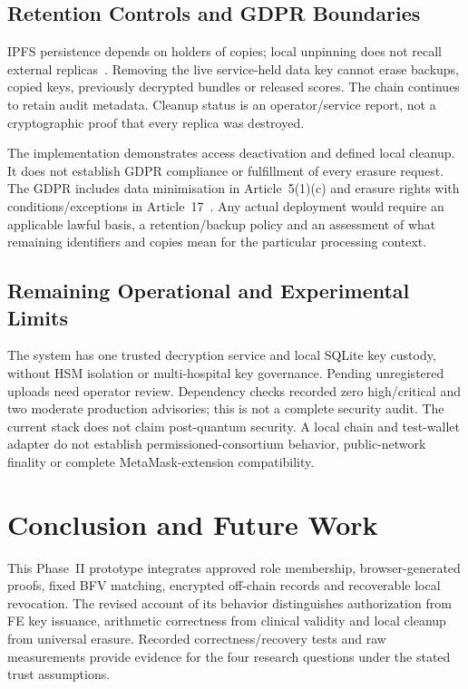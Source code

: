 \documentclass[10pt,twocolumn,a4paper]{article}
\begin{document}
\subsection{Retention Controls and GDPR Boundaries}
IPFS persistence depends on holders of copies; local unpinning does not recall
external replicas~\cite{ipfs}. Removing the live service-held data key cannot erase
backups, copied keys, previously decrypted bundles or released scores. The chain
continues to retain audit metadata. Cleanup status is an operator/service report,
not a cryptographic proof that every replica was destroyed.

The implementation demonstrates access deactivation and defined local cleanup.
It does not establish GDPR compliance or fulfillment of every erasure request.
The GDPR includes data minimisation in Article~5(1)(c) and erasure rights with
conditions/exceptions in Article~17~\cite{gdpr}. Any actual deployment would require
an applicable lawful basis, a retention/backup policy and an assessment of what
remaining identifiers and copies mean for the particular processing context.

\subsection{Remaining Operational and Experimental Limits}
The system has one trusted decryption service and local SQLite key custody,
without HSM isolation or multi-hospital key governance. Pending unregistered uploads
need operator review. Dependency checks recorded zero high/critical and two moderate
production advisories; this is not a complete security audit. The current stack
does not claim post-quantum security. A local chain and test-wallet adapter do not
establish permissioned-consortium behavior, public-network finality or complete
MetaMask-extension compatibility.

\section{Conclusion and Future Work}
\label{sec:conclusion}
This Phase~II prototype integrates approved role membership, browser-generated
proofs, fixed BFV matching, encrypted off-chain records and recoverable local
revocation. The revised account of its behavior distinguishes authorization from
FE key issuance, arithmetic correctness from clinical validity and local cleanup
from universal erasure. Recorded correctness/recovery tests and raw measurements
provide evidence for the four research questions under the stated trust assumptions.
\end{document}
